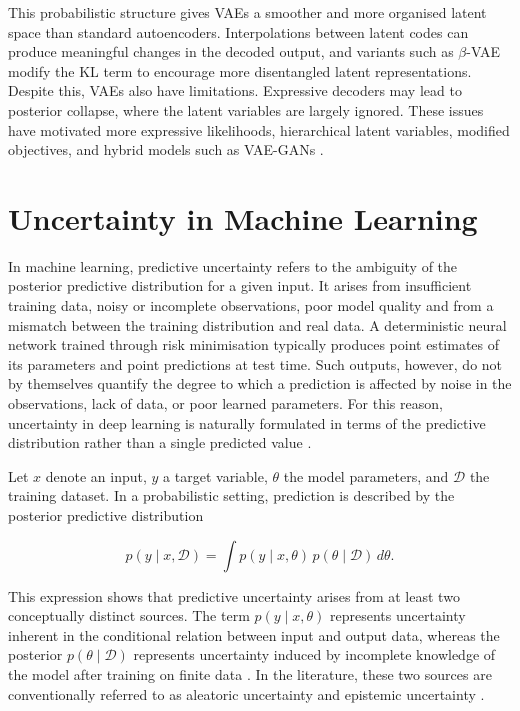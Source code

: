 This probabilistic structure gives VAEs a smoother and more organised latent space than standard autoencoders. Interpolations between latent codes can produce meaningful changes in the decoded output, and variants such as \(\beta\)-VAE modify the KL term to encourage more disentangled latent representations. Despite this, VAEs also have limitations. Expressive decoders may lead to posterior collapse, where the latent variables are largely ignored. These issues have motivated more expressive likelihoods, hierarchical latent variables, modified objectives, and hybrid models such as VAE-GANs \cite{Kingma2013AutoEncodingVB,Higgins2017betaVAE}.

\section{Uncertainty in Machine Learning}  \label{chapter:Uncertainty}

In machine learning, predictive uncertainty refers to the ambiguity of the posterior predictive distribution for a given input. It arises from insufficient training data, noisy or incomplete observations, poor model quality and from a mismatch between the training distribution and real data. A deterministic neural network trained through risk minimisation typically produces point estimates of its parameters and point predictions at test time. Such outputs, however, do not by themselves quantify the degree to which a prediction is affected by noise in the observations, lack of data, or poor learned parameters. For this reason, uncertainty in deep learning is naturally formulated in terms of the predictive distribution rather than a single predicted value \cite{kendall2017uncertainties,mena2021survey}.

Let \(x\) denote an input, \(y\) a target variable, \(\theta\) the model parameters, and \(\mathcal{D}\) the training dataset. In a probabilistic setting, prediction is described by the posterior predictive distribution

\begin{equation}
p(y \mid x, \mathcal{D}) = \int p(y \mid x, \theta)\, p(\theta \mid \mathcal{D})\, d\theta .
\end{equation}

This expression shows that predictive uncertainty arises from at least two conceptually distinct sources. The term \(p(y \mid x, \theta)\) represents uncertainty inherent in the conditional relation between input and output data, whereas the posterior \(p(\theta \mid \mathcal{D})\) represents uncertainty induced by incomplete knowledge of the model after training on finite data \cite{kendall2017uncertainties}. In the literature, these two sources are conventionally referred to as aleatoric uncertainty and epistemic uncertainty \cite{derkiureghian2009aleatory,kendall2017uncertainties}.

